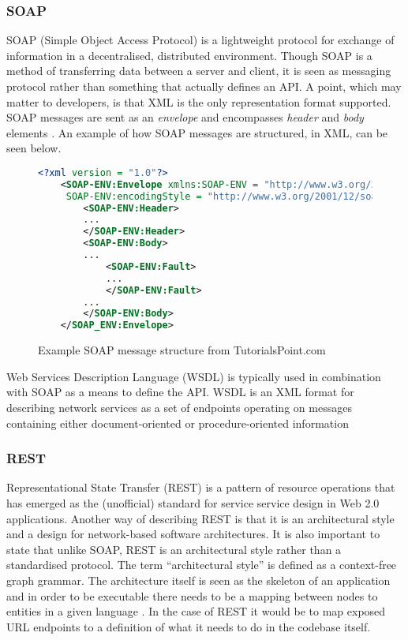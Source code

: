 \subsubsection{SOAP}

SOAP (Simple Object Access Protocol) is a lightweight protocol for exchange of information in a decentralised, distributed environment.
Though SOAP is a method of transferring data between a server and client, it is seen as messaging protocol rather than something that actually defines
an API.
A point, which may matter to developers, is that XML is the only representation format supported. 
SOAP messages are sent as an \textit{envelope} and encompasses \textit{header} and \textit{body} elements \cite{gruschka2006protecting}\cite{box2000simple}. 
An example of how SOAP messages are structured, in XML, can be seen below. 

\begin{figure}[ht]
    \begin{lstlisting}[language=XML, numbers=none]
<?xml version = "1.0"?>
    <SOAP-ENV:Envelope xmlns:SOAP-ENV = "http://www.w3.org/2001/12/soap-envelope" 
     SOAP-ENV:encodingStyle = "http://www.w3.org/2001/12/soap-encoding">
        <SOAP-ENV:Header>
        ...
        </SOAP-ENV:Header>
        <SOAP-ENV:Body>      
        ...
            <SOAP-ENV:Fault>
            ...
            </SOAP-ENV:Fault>
        ...
        </SOAP-ENV:Body>
    </SOAP_ENV:Envelope>
    \end{lstlisting}
    \caption{Example SOAP message structure from TutorialsPoint.com}
\end{figure}

Web Services Description Language (WSDL) is typically used in combination with SOAP as a means to define the API. 
WSDL is an XML format for describing network services as a set of endpoints operating on messages containing either document-oriented or procedure-oriented
information \cite{christensen2001web}


\subsubsection{REST}
Representational State Transfer (REST) is a pattern of resource operations that has emerged as the (unofficial) standard for service service
design in Web 2.0 applications. Another way of describing REST is that it is an architectural style and a design for network-based
software architectures.
It is also important to state that unlike SOAP, REST is an architectural style rather than a standardised protocol.
The term ``architectural style'' is defined as a context-free graph grammar.
The architecture itself is seen as the skeleton of an application and in order to be executable there needs to be a mapping between nodes
to entities in a given language \cite{le1998describing} .
In the case of REST it would be to map exposed URL endpoints to a definition of what it needs to do in the codebase itself.

